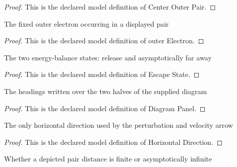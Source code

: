 \begin{proof}
  This is the declared model definition of Center Outer Pair.
\end{proof}
\begin{definition}
  \label{def:physics:phyx-mini-0853:phyxminiproblems-problemphyxmini0853-centerouterpair-outerelectron}
  The fixed outer electron occurring in a displayed pair
\end{definition}
\begin{proof}
  This is the declared model definition of outer Electron.
\end{proof}
\begin{definition}
  \label{def:physics:phyx-mini-0853:phyxminiproblems-problemphyxmini0853-escapestate}
  The two energy-balance states: release and asymptotically far away
\end{definition}
\begin{proof}
  This is the declared model definition of Escape State.
\end{proof}
\begin{definition}
  \label{def:physics:phyx-mini-0853:phyxminiproblems-problemphyxmini0853-diagrampanel}
  The headings written over the two halves of the supplied diagram
\end{definition}
\begin{proof}
  This is the declared model definition of Diagram Panel.
\end{proof}
\begin{definition}
  \label{def:physics:phyx-mini-0853:phyxminiproblems-problemphyxmini0853-horizontaldirection}
  The only horizontal direction used by the perturbation and velocity arrow
\end{definition}
\begin{proof}
  This is the declared model definition of Horizontal Direction.
\end{proof}
\begin{definition}
  \label{def:physics:phyx-mini-0853:phyxminiproblems-problemphyxmini0853-separationregime}
  Whether a depicted pair distance is finite or asymptotically infinite
\end{definition}

